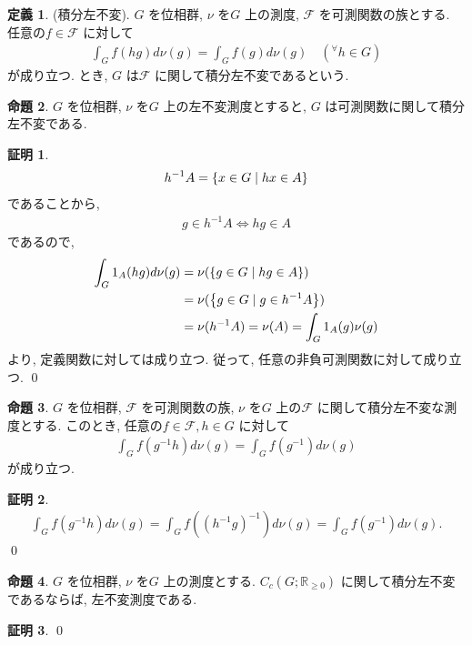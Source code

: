 \documentclass[10pt, fleqn, label-section=none]{bxjsarticle}
\theoremstyle{definition}
\newtheorem{dfn}{定義}[section]
\newtheorem{prop}[dfn]{命題}
\newtheorem*{pf*}{証明}
\newcommand{\any}{{}^{\forall}}
\newcommand{\cbra}[1]{\mleft\{#1\mright\}}
\newcommand{\LR}{\Leftrightarrow}
\renewcommand{\;}{\, ; \,}
\begin{document}
\begin{dfn}(積分左不変). $G$ を位相群, $\nu$ を$G$ 上の測度, $\mathcal F$ を可測関数の族とする. 任意の$f \in \mathcal F$ に対して
\begin{align*} \int_G f (hg) d \nu(g) = \int_G f (g) d\nu(g) \quad (\any h \in G)\end{align*}
が成り立つ. とき, $G$ は$\mathcal F$ に関して積分左不変であるという.
\end{dfn}



\begin{prop} $G$ を位相群, $\nu$ を$G$ 上の左不変測度とすると, $G$ は可測関数に関して積分左不変である.
\end{prop}
\begin{pf*}
\begin{align*} h^{-1} A = \cbra{x \in G \mid hx \in A} \end{align*}
であることから, 
\begin{align*} g \in h^{-1}A  \LR hg \in A \end{align*}
であるので, 
\begin{align*} \int_G 1_A (hg) d\nu(g) &= \nu(\cbra{g \in G \mid hg \in A}) \\ 
&= \nu(\cbra{g \in G \mid g \in h^{-1}A }) \\
&= \nu(h^{-1}A) = \nu (A) = \int_G 1_A (g) \nu(g) 
\end{align*}
より, 定義関数に対しては成り立つ. 従って, 任意の非負可測関数に対して成り立つ.
\qed
\end{pf*}

\begin{prop} $G$ を位相群, $\mathcal F$ を可測関数の族, $\nu$ を$G$ 上の$\mathcal F$ に関して積分左不変な測度とする. このとき, 任意の$f \in \mathcal F, h \in G$ に対して
\begin{align*} \int_G f(g^{-1} h)d\nu(g) = \int_{G} f(g^{-1}) d\nu(g)  \end{align*}
が成り立つ. 
\end{prop}
\begin{pf*}
\begin{align*} \int_G f(g^{-1} h)d\nu(g) =\int_G f((h^{-1} g)^{-1} ) d\nu(g) = \int_{G} f(g^{-1}) d\nu(g).  \end{align*}
\qed
\end{pf*}

\begin{prop}$G$ を位相群, $\nu$ を$G$ 上の測度とする. $C_c (G; \mathbb R_{\geq 0})$ に関して積分左不変であるならば, 左不変測度である.

\end{prop}
\begin{pf*}

\qed
\end{pf*}
\end{document}
